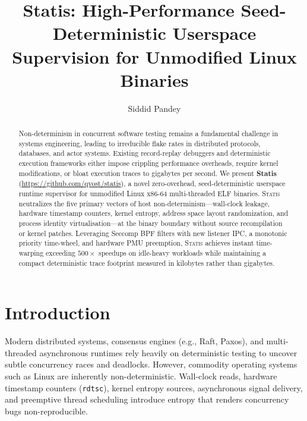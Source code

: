 \documentclass[twocolumn,10pt,sigconf,nonacm]{acmart}
\begin{document}
\title{Statis: High-Performance Seed-Deterministic Userspace Supervision for Unmodified Linux Binaries}

\author{Siddid Pandey}

\begin{abstract}
Non-determinism in concurrent software testing remains a fundamental challenge in systems engineering, leading to irreducible flake rates in distributed protocols, databases, and actor systems. Existing record-replay debuggers and deterministic execution frameworks either impose crippling performance overheads, require kernel modifications, or bloat execution traces to gigabytes per second. We present \textbf{Statis} (\url{https://github.com/qvost/statis}), a novel zero-overhead, seed-deterministic userspace runtime supervisor for unmodified Linux x86-64 multi-threaded ELF binaries. \textsc{Statis} neutralizes the five primary vectors of host non-determinism---wall-clock leakage, hardware timestamp counters, kernel entropy, address space layout randomization, and process identity virtualisation---at the binary boundary without source recompilation or kernel patches. Leveraging Seccomp BPF filters with new listener IPC, a monotonic priority time-wheel, and hardware PMU preemption, \textsc{Statis} achieves instant time-warping exceeding $500\times$ speedups on idle-heavy workloads while maintaining a compact deterministic trace footprint measured in kilobytes rather than gigabytes.
\end{abstract}


\maketitle

\section{Introduction}

Modern distributed systems, consensus engines (e.g., Raft, Paxos), and multi-threaded asynchronous runtimes rely heavily on deterministic testing to uncover subtle concurrency races and deadlocks. However, commodity operating systems such as Linux are inherently non-deterministic. Wall-clock reads, hardware timestamp counters (\texttt{rdtsc}), kernel entropy sources, asynchronous signal delivery, and preemptive thread scheduling introduce entropy that renders concurrency bugs non-reproducible.
\end{document}
